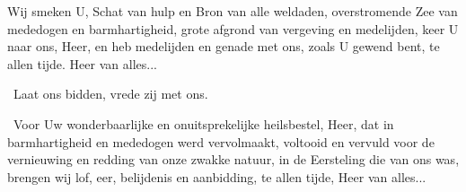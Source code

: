 \documentclass[12pt,twoside,a5paper]{article}
\begin{document}
\begin{halfparskip}
   Wij smeken U, Schat van hulp en Bron van alle weldaden, overstromende Zee van mededogen en barmhartigheid, grote afgrond van vergeving en medelijden, keer U naar ons, Heer, en heb medelijden en genade met ons, zoals U gewend bent, te allen tijde. Heer van alles...
\end{halfparskip}



\begin{halfparskip}
  \dd~Laat ons bidden, vrede zij met ons.

  \cc~Voor Uw wonderbaarlijke en onuitsprekelijke heilsbestel, Heer, dat in barmhartigheid en mededogen werd vervolmaakt, voltooid en vervuld voor de vernieuwing en redding van onze zwakke natuur, in de Eersteling die van ons was, brengen wij lof, eer, belijdenis en aanbidding, te allen tijde, Heer van alles...
\end{halfparskip}






\end{document}
